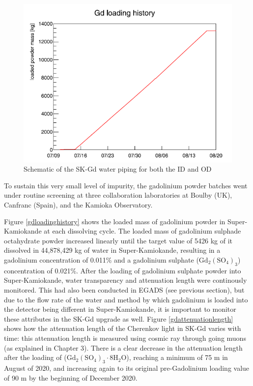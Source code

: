 \begin{figure}[H]
    \includegraphics[width=\textwidth]{Figures/gdloadinghistory.png}
    \caption{Schematic of the SK-Gd water piping for both the ID and OD}
    \label{fig:gdloadinghistory}
\end{figure}

To sustain this very small level of impurity, the gadolinium powder batches went under routine screening at three collaboration laboratories at Boulby (UK), Canfranc (Spain), and the Kamioka Observatory. 

Figure \ref{gdloadinghistory} shows the loaded mass of gadolinium powder in Super-Kamiokande at each dissolving cycle. The loaded mass of gadolinium sulphade octahydrate powder increased linearly until the target value of 5426 kg of it dissolved in 44,878,429 kg of water in Super-Kamiokande, resulting in a gadolinium concentration of 0.011\% and a gadolinium sulphate ($\mathrm{Gd}_{2}\left(\mathrm{SO}_{4}\right)_{3}$) concentration of 0.021\%. After the loading of gadolinium sulphate powder into Super-Kamiokande, water transparency and attenuation length were continously monitored. This had also been conducted in EGADS (see previous section), but due to the flow rate of the water and method by which gadolinium is loaded into the detector being different in Super-Kamiokande, it is important to monitor these attributes in the SK-Gd upgrade as well. Figure \ref{gdattenuationlength} shows how the attenuation length of the Cherenkov light in SK-Gd varies with time: this attenuation length is measured using cosmic ray through going muons (as explained in Chapter 3). There is a clear decrease in the attenuation length after the loading of ($
\mathrm{Gd}_{2}\left(\mathrm{SO}_{4}\right)_{3} \cdot 8 \mathrm{H}_{2} \mathrm{O}
$), reaching a minimum of 75 m in August of 2020, and increasing again to its original pre-Gadolinium loading value of 90 m by the beginning of December 2020.  
\newline

